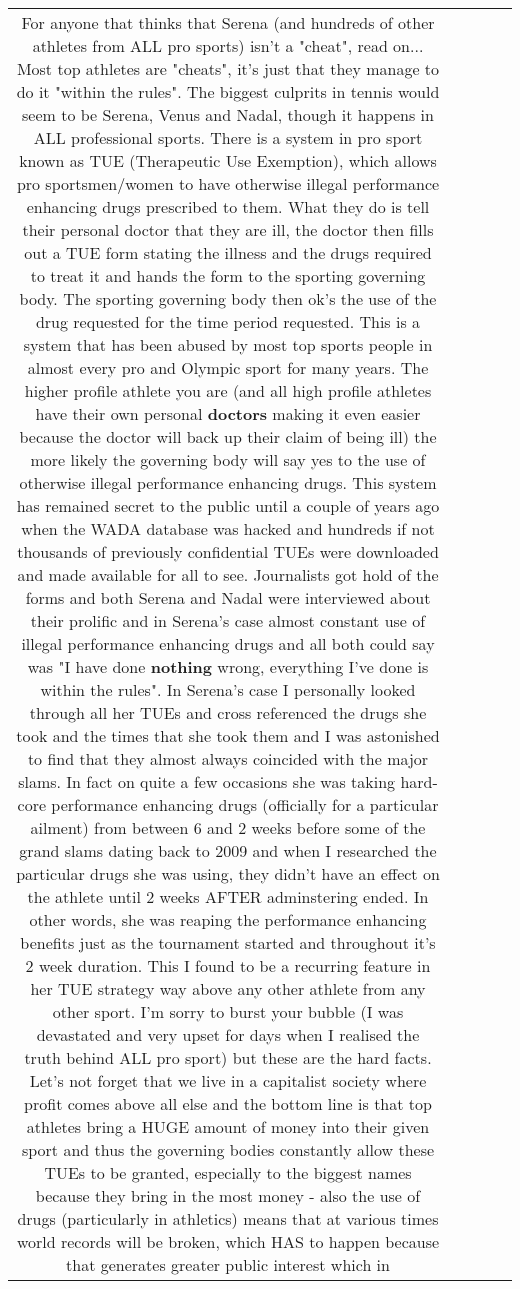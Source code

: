 \documentclass[11pt]{article}
\newlength\mylength
\begin{document}
\begin{center}
\begin{longtable}{|C{.65\mylength}|C{.30\mylength}|C{.12\mylength}|C{.12\mylength}|C{.12\mylength}|}
  \small For anyone that thinks that Serena (and hundreds of other athletes from ALL pro sports) isn't a "cheat", read on... Most top athletes are "cheats", it's just that they manage to do it "within the rules". The biggest culprits in tennis would seem to be Serena, Venus and Nadal, though it happens in ALL professional sports. There is a system in pro sport known as TUE (Therapeutic Use Exemption), which allows pro sportsmen/women to have otherwise illegal performance enhancing drugs prescribed to them. What they do is tell their personal doctor that they are ill, the doctor then fills out a TUE form stating the illness and the drugs required to treat it and hands the form to the sporting governing body. The sporting governing body then ok's the use of the drug requested for the time period requested. This is a system that has been abused by most top sports people in almost every pro and Olympic sport for many years. The higher profile athlete you are (and all high profile athletes have their own personal \textbf{doctors} making it even easier because the doctor will back up their claim of being ill) the more likely the governing body will say yes to the use of otherwise illegal performance enhancing drugs. This system has remained secret to the public until a couple of years ago when the WADA database was hacked and hundreds if not thousands of previously confidential TUEs were downloaded and made available for all to see. Journalists got hold of the forms and both Serena and Nadal were interviewed about their prolific and in Serena's case almost constant use of illegal performance enhancing drugs and all both could say was "I have done \textbf{nothing} wrong, everything I've done is within the rules". In Serena's case I personally looked through all her TUEs and cross referenced the drugs she took and the times that she took them and I was astonished to find that they almost always coincided with the major slams. In fact on quite a few occasions she was taking hard-core performance enhancing drugs (officially for a particular ailment) from between 6 and 2 weeks before some of the grand slams dating back to 2009 and when I researched the particular drugs she was using, they didn't have an effect on the athlete until 2 weeks AFTER adminstering ended. In other words, she was reaping the performance enhancing benefits just as the tournament started and throughout it's 2 week duration. This I found to be a recurring feature in her TUE strategy way above any other athlete from any other sport. I'm sorry to burst your bubble (I was devastated and very upset for days when I realised the truth behind ALL pro sport) but these are the hard facts. Let's not forget that we live in a capitalist society where profit comes above all else and the bottom line is that top athletes bring a HUGE amount of money into their given sport and thus the governing bodies constantly allow these TUEs to be granted, especially to the biggest names because they bring in the most money - also the use of drugs (particularly in athletics) means that at various times world records will be broken, which HAS to happen because that generates greater public interest which in 
\end{longtable}
\end{center}
\end{document}
